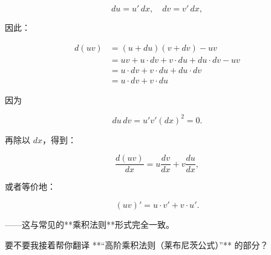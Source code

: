$$
du = u'\,dx, \quad dv = v'\,dx,
$$

因此：

$$
\begin{aligned}
d(uv) &= (u+du)(v+dv) - uv \\
&= uv + u\cdot dv + v\cdot du + du\cdot dv - uv \\
&= u\cdot dv + v\cdot du + du\cdot dv \\
&= u\cdot dv + v\cdot du
\end{aligned}
$$

因为

$$
du\,dv = u'v'(dx)^2 = 0.
$$

再除以 $dx$，得到：

$$
\frac{d(uv)}{dx} = u\frac{dv}{dx} + v\frac{du}{dx},
$$

或者等价地：

$$
(uv)' = u\cdot v' + v\cdot u'.
$$

——这与常见的**乘积法则**形式完全一致。

要不要我接着帮你翻译 **“高阶乘积法则（莱布尼茨公式）”** 的部分？
